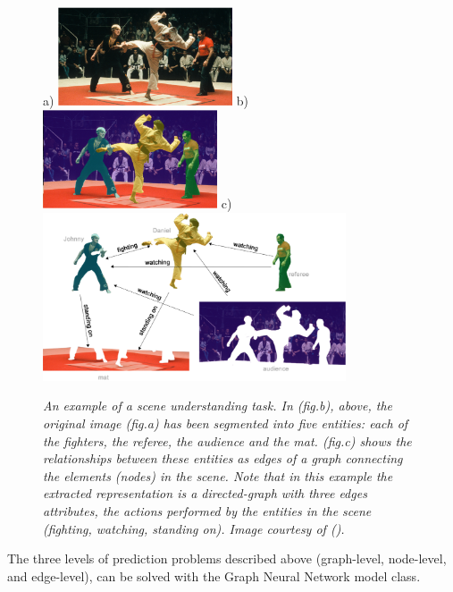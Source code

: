 \documentclass[binding=0.6cm]{sapthesis}
\newcommand{\mycite}[1]{(\cite{#1})}
\begin{document}
\begin{figure}
    \centering
    \footnotesize a) \includegraphics[width=0.46\textwidth]{imgs/background/scene-under-01.png}
    \footnotesize b) \includegraphics[width=0.46\textwidth]{imgs/background/scene-under-02.png}
    \footnotesize c) \includegraphics[width=0.8\textwidth]{imgs/background/scene-under-03.png}
    \caption{\textit{An example of a scene understanding task. In (fig.b), above, the original image (fig.a) has been segmented into five entities: each of the fighters, the referee, the audience and the mat. (fig.c) shows the relationships between these entities as edges of a graph connecting the elements (nodes) in the scene. Note that in this example the extracted representation is a directed-graph with three edges attributes, the actions performed by the entities in the scene (fighting, watching, standing on). Image courtesy of \mycite{distilPub-sanchez-lengeling2021a}.}}
    \label{fig:bg.gnn.scene-under}
\end{figure}

The three levels of prediction problems described above (graph-level, node-level, and edge-level), can be solved with the Graph Neural Network model class. 

\end{document}
